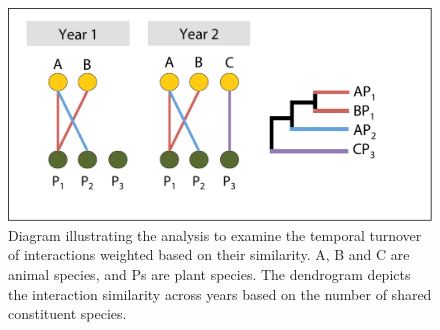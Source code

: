 \documentclass[12pt]{article}
\begin{document}





\begin{figure}
  \centering
  \includegraphics[width=.8\textwidth]{figures/scheme.pdf}
  \caption{Diagram illustrating the analysis to examine the temporal
    turnover of interactions weighted based on their similarity. A, B
    and C are animal species, and Ps are plant species. The dendrogram
    depicts the interaction similarity across years based on the
    number of shared constituent species.}
  \label{fig:methods}
\end{figure}
\clearpage
\end{document}
